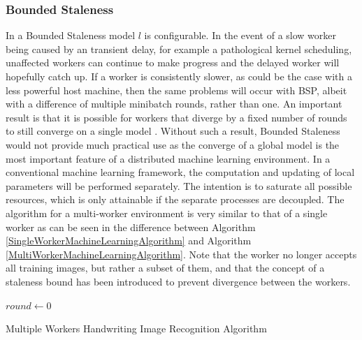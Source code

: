 \documentclass[12pt]{article}
\begin{document}
\subsubsection{Bounded Staleness}
In a Bounded Staleness model $l$ is configurable. In the event of a slow worker being caused by an transient delay, for example a pathological kernel scheduling, unaffected workers can continue to make progress and the delayed worker will hopefully catch up. If a worker is consistently slower, as could be the case with a less powerful host machine, then the same problems will occur with BSP, albeit with a difference of multiple minibatch rounds, rather than one. An important result is that it is possible for workers that diverge by a fixed number of rounds to still converge on a single model \cite{NIPS2013_4894}. Without such a result, Bounded Staleness would not provide much practical use as the converge of a global model is the most important feature of a distributed machine learning environment.
\newline
\newline
In a conventional machine learning framework, the computation and updating of local parameters will be performed separately. The intention is to saturate all possible resources, which is only attainable if the separate processes are decoupled.
\newline
\newline
The algorithm for a multi-worker environment is very similar to that of a single worker as can be seen in the difference between Algorithm \ref{SingleWorkerMachineLearningAlgorithm} and Algorithm \ref{MultiWorkerMachineLearningAlgorithm}. Note that the worker no longer accepts all training images, but rather a subset of them, and that the concept of a staleness bound has been introduced to prevent divergence between the workers.

\IncMargin{1em}
\begin{algorithm}[H]
 \BlankLine

 $round \longleftarrow 0$\;
 \caption{Multiple Workers Handwriting Image Recognition Algorithm}
 \label{MultiWorkerMachineLearningAlgorithm}
\end{algorithm}
\DecMargin{1em}
\end{document}
